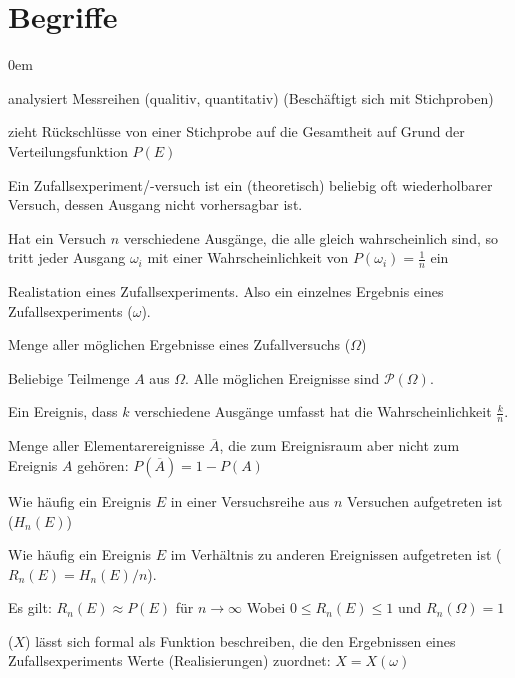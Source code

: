 \section{Begriffe}

\begin{description}\itemsep0em
	\item [Deskriptive Statistik] 
	analysiert Messreihen (qualitiv, quantitativ) (Beschäftigt sich mit Stichproben)
	
	\item [Schliessende Statistik] 
	zieht Rückschlüsse von einer Stichprobe auf die Gesamtheit auf Grund der Verteilungsfunktion $P(E)$
	
	\item [Zufallsexperiment] 
	Ein Zufallsexperiment/-versuch ist ein (theoretisch) beliebig oft wiederholbarer Versuch, dessen Ausgang nicht vorhersagbar ist.
	
	Hat ein Versuch $n$ verschiedene Ausgänge, die alle gleich wahrscheinlich sind, so tritt jeder Ausgang $\omega_i$ mit einer Wahrscheinlichkeit von $P(\omega_i) = \frac{1}{n}$ ein

	\item [Elementarereignis] 
	Realistation eines Zufallsexperiments. Also ein einzelnes Ergebnis eines Zufallsexperiments ($\omega$).
	
	\item [Ereignisraum] 
	Menge aller möglichen Ergebnisse eines Zufallversuchs ($\Omega$)
	
	\item [Ereignis] 
	Beliebige Teilmenge $A$ aus $\Omega$. Alle möglichen Ereignisse sind $\mathcal{P}(\Omega)$.
	
	Ein Ereignis, dass $k$ verschiedene Ausgänge umfasst hat die Wahrscheinlichkeit $\frac{k}{n}$.

	\item [Komplementarereignis] 
	Menge aller Elementarereignisse $\overline{A}$, die zum Ereignisraum aber nicht zum Ereignis $A$ gehören: $P(\overline{A}) = 1 - P(A)$
	
	\item [Absolute Häufigkeit] 
	Wie häufig ein Ereignis $E$ in einer Versuchsreihe aus $n$ Versuchen aufgetreten ist ($H_n(E)$)
	
	\item [Relative Häufigkeit] 
	Wie häufig ein Ereignis $E$ im Verhältnis zu anderen Ereignissen aufgetreten ist ($R_n(E) = H_n(E)/n$). 

	Es gilt: $R_n(E) \approx P(E)$ für $n \rightarrow \infty$ Wobei $0 \leq R_n(E) \leq 1$ und $R_n(\Omega) = 1$

	\item [Zufallsvariable]
	($X$) lässt sich formal als Funktion beschreiben, die den Ergebnissen eines Zufallsexperiments Werte (Realisierungen) zuordnet: $X = X(\omega)$

\end{description}

